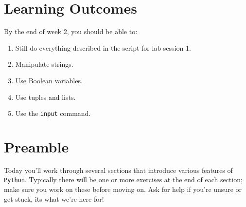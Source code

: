 \section{Learning Outcomes}

By the end of week 2, you should be able to:

\begin{enumerate}
\item Still do everything described in the script for lab session 1.
\item Manipulate strings.
\item Use Boolean variables.
\item Use tuples and lists.
\item Use the {\tt input} command.
\end{enumerate}


\section{Preamble} 

Today you'll work through several sections that introduce various features of \texttt{Python}. Typically there will be one or more exercises at the end of each section; make sure you work on these before moving on. Ask for help if you're unsure or get stuck, its what we're here for!





